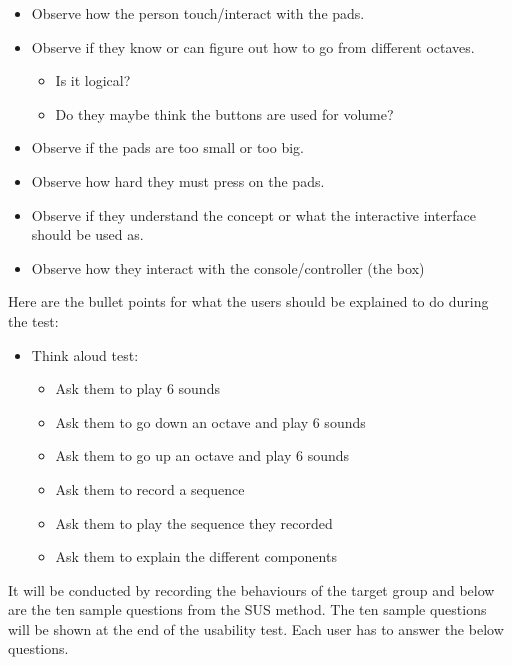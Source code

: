 \begin{itemize} 
\item 	Observe how the person touch/interact with the pads. 
\item	Observe if they know or can figure out how to go from different octaves. 
	\begin{itemize} 
		\item 	Is it logical? 
		\item 	Do they maybe think the buttons are used for volume? 
	\end{itemize} 
\item 	Observe if the pads are too small or too big.
\item 	Observe how hard they must press on the pads. 
\item 	Observe if they understand the concept or what the interactive interface should be used as. 
\item 	Observe how they interact with the console/controller (the box)
\end{itemize}
\par
Here are the bullet points for what the users should be explained to do during the test: \par
\begin{itemize} 
\item 	Think aloud test:
	\begin{itemize}  
		\item 	Ask them to play 6 sounds 
		\item 	Ask them to go down an octave and play 6 sounds
		\item   Ask them to go up an octave and play 6 sounds
		\item 	Ask them to record a sequence
		\item   Ask them to play the sequence they recorded
		\item 	Ask them to explain the different components 
	\end{itemize} 
\end{itemize} \par
It will be conducted by recording the behaviours of the target group and below are the ten sample questions from the SUS method. The ten sample questions will be shown at the end of the usability test. Each user has to answer the below questions. \par
